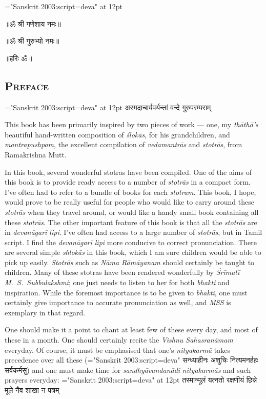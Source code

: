 {\font \x="Sanskrit 2003:script=deva" at 12pt\x
\centerline{॥ॐ श्री गणेशाय नमः॥}
\centerline{॥ॐ श्री गुरुभ्यो नमः॥}
\centerline{॥हरिः ॐ॥}
}

\setmainfont{Candara}
\begin{center}
\chapter[\large{\fontspec{Candara}{Preface}}]{\texorpdfstring{\scshape{Preface}}{Preface}}
\end{center}

{\font \x="Sanskrit 2003:script=deva" at 12pt\x
{}
{अस्मदाचार्यपर्यन्तां वन्दे गुरुपरम्पराम्}
}

This book has been primarily inspired by two pieces of work --- one, my \textit{thāthā's} beautiful hand-written composition of \textit{ślokās}, for his grandchildren, and \textit{mantrapushpam}, the excellent compilation of 
\textit{veda\-mantrās} and \textit{stotrās}, from Ramakrishna Mutt.

In this book, several wonderful stotras have been compiled. One of the aims of this book is to provide ready access to a number of \textit{stotrās} in a compact form. I've often had to refer to a bundle of books for each \textit{stotram}. This book, I hope, would prove to be really useful for people who would like to carry around these \textit{stotrās} when they travel around, or would like a handy small book containing all these \textit{stotrās}. The other important feature of this book is that all the \textit{stotrās} are in \textit{devanāgarī lipi}. I've often had access to a large number of \textit{stotrās}, but in Tamil script. I find the \textit{devanāgarī lipi} more conducive to correct pronunciation. There are several simple \textit{shlokās} in this book, which I am sure children would be able to pick up easily. \textit{Stotrās} such as \textit{Nāma Rāmāyanam} should certainly be taught to children. Many of these stotras have been rendered wonderfully by \textit{Śrīmatī} \textit{M.~S.~Subbulakshmi}; one just needs to listen to her for both \textit{bhakti} and inspiration. While the foremost importance is to be given to \textit{bhakti}, one must certainly give importance to accurate pronunciation as well, and \textit{MSS} is exemplary in that regard.

One should make it a point to chant at least few of these every day, and most of these in a month. One should certainly recite the \textit{Vishnu Sahasranāmam} everyday. Of course, it must be emphasised that one's \textit{nityakarmā} takes precedence over all these ({\font \x="Sanskrit 2003:script=deva" \x सन्ध्याहीनः अशुचिः नित्यमनर्हहः सर्व\-कर्मसु}) and one must make time for \textit{sandhyāvandanādi} \textit{nityakarmās} and such prayers everyday:
{\font \x="Sanskrit 2003:script=deva" at 12pt\x
{}
{तस्मान्मूलं यत्नतो रक्षणीयं छिन्ने मूले नैव शाखा न पत्रम्}
}

